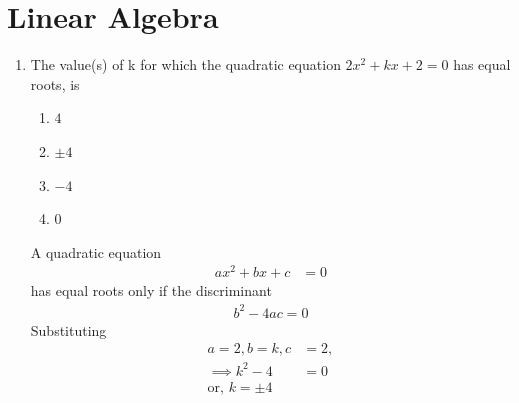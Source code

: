 \documentclass[journal,12pt,twocolumn]{IEEEtran}
\begin{document}
\section{Linear Algebra}
\begin{enumerate}[label=1.\arabic*]

\item The value(s) of k for which the quadratic equation $2x^2 + kx + 2 = 0$ has equal roots, is
\begin{enumerate}
    \item $4$
    \item $\pm 4$
    \item $- 4$\
    \item $0$
\end{enumerate}
\solution 
A quadratic equation 
		\begin{align}
			ax^2+bx + c  &= 0
		\end{align}
		has equal roots only if 
 the discriminant
		\begin{align}
			b^2 - 4a c  = 0
		\end{align}
		Substituting
		\begin{align}
			a = 2, b = k, c &= 2,
			\\
\implies 			k^2 - 4 &= 0
			\\
			\text{or, }k = \pm 4
		\end{align}


\end{enumerate}
\end{document}
